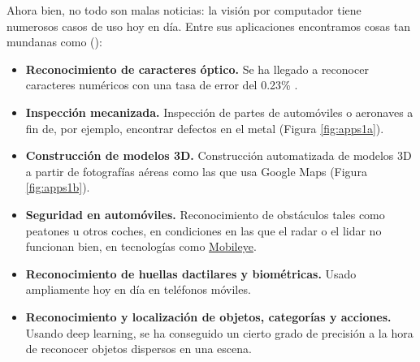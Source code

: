 Ahora bien, no todo son malas noticias: la visión por computador tiene numerosos casos de uso hoy en día. Entre sus aplicaciones encontramos cosas tan mundanas como (\citeauthor*{book:szeliski}):
\begin{itemize}
\item \textbf{Reconocimiento de caracteres óptico.} Se ha llegado a reconocer caracteres numéricos con una tasa de error del 0.23\% \cite{art:2012arXiv1202.2745C}.
\item \textbf{Inspección mecanizada.} Inspección de partes de automóviles o aeronaves a fin de, por ejemplo, encontrar defectos en el metal (Figura \ref{fig:apps1a}).
\item \textbf{Construcción de modelos 3D.} Construcción automatizada de modelos 3D a partir de fotografías aéreas como las que usa Google Maps (Figura \ref{fig:apps1b}).
\item \textbf{Seguridad en automóviles.} Reconocimiento de obstáculos tales como peatones u otros coches, en condiciones en las que el radar o el lidar no funcionan bien, en tecnologías como \href{https://www.mobileye.com/}{Mobileye}.
\item \textbf{Reconocimiento de huellas dactilares y biométricas.} Usado ampliamente hoy en día en teléfonos móviles.
\item \textbf{Reconocimiento y localización de objetos, categorías y acciones.} Usando deep learning, se ha conseguido un cierto grado de precisión a la hora de reconocer objetos dispersos en una escena.
\end{itemize}

